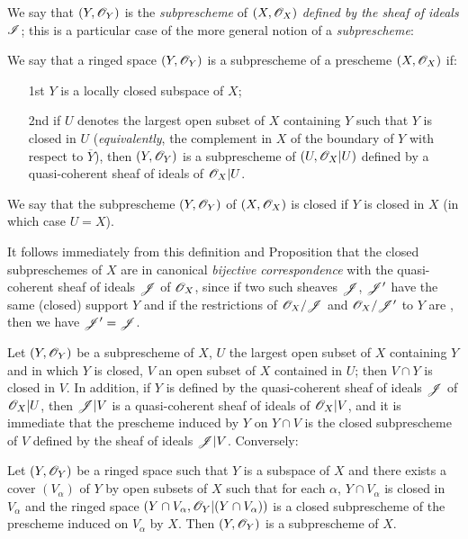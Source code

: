 We say that $(Y,\mathscr{O}_Y)$ is the {\em subprescheme} of $(X,\mathscr{O}_X)$ {\em defined by the
sheaf of ideals $\mathscr{I}$}; this is a particular case of the more general notion of a
{\em subprescheme}:

\begin{defn}[4.1.3]
\label{1.4.1.3}
We say that a ringed space $(Y,\mathscr{O}_Y)$ is a subprescheme of a prescheme $(X,\mathscr{O}_X)$ if:
\begin{enumerate}
  \item[1st] $Y$ is a locally closed subspace of $X$;
  \item[2nd] if $U$ denotes the largest open subset of $X$ containing $Y$ such that
    $Y$ is closed in $U$ ({\em equivalently}, the complement in $X$ of the
    boundary of $Y$ with respect to $\overline{Y}$), then $(Y,\mathscr{O}_Y)$ is
    a subprescheme of $(U,\mathscr{O}_X|U)$ defined by a quasi-coherent sheaf of ideals of $\mathscr{O}_X|U$.
\end{enumerate}
We say that the subprescheme $(Y,\mathscr{O}_Y)$ of $(X,\mathscr{O}_X)$ is closed if $Y$ is closed in $X$
(in which case $U=X$).
\end{defn}

It follows immediately from this definition and Proposition 
that the closed subpreschemes of $X$ are in canonical {\em bijective correspondence} with the
quasi-coherent sheaf of ideals $\mathscr{J}$ of $\mathscr{O}_X$, since if two such sheaves
$\mathscr{J}$, $\mathscr{J}'$ have the same (closed) support $Y$ and if the restrictions of
$\mathscr{O}_X/\mathscr{J}$ and $\mathscr{O}_X/\mathscr{J}'$ to $Y$ are , then we have $\mathscr{J}'=\mathscr{J}$.

\begin{env}[4.1.4]
\label{1.4.1.4}
Let $(Y,\mathscr{O}_Y)$ be a subprescheme of $X$, $U$ the largest open subset of $X$ containing $Y$
and in which $Y$ is closed, $V$ an open subset of $X$ contained in $U$; then $V\cap Y$ is
closed in $V$. In addition, if $Y$ is defined by the quasi-coherent sheaf of ideals $\mathscr{J}$
of $\mathscr{O}_X|U$, then $\mathscr{J}|V$ is a quasi-coherent sheaf of ideals of $\mathscr{O}_X|V$, and it is
immediate that the prescheme induced by $Y$ on $Y\cap V$ is the closed subprescheme of $V$
defined by the sheaf of ideals $\mathscr{J}|V$. Conversely:
\end{env}

\begin{prop}[4.1.5]
\label{1.4.1.5}
Let $(Y,\mathscr{O}_Y)$ be a ringed space such that $Y$ is a subspace of $X$ and there exists a
cover $(V_\alpha)$ of $Y$ by open subsets of $X$ such that for each $\alpha$,
$Y\cap V_\alpha$ is closed in $V_\alpha$ and the ringed space
$(Y\cap V_\alpha,\mathscr{O}_Y|(Y\cap V_\alpha))$ is a closed subprescheme of the prescheme induced
on $V_\alpha$ by $X$. Then $(Y,\mathscr{O}_Y)$ is a subprescheme of $X$.
\end{prop}

